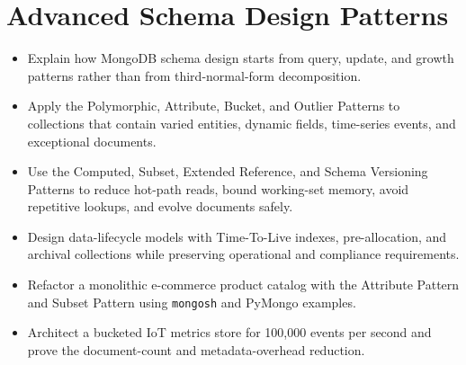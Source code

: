\chapter{Advanced Schema Design Patterns}
%

\begin{objectives}
\begin{itemize}
    \item Explain how MongoDB schema design starts from query, update, and growth patterns rather than from third-normal-form decomposition.
    \item Apply the Polymorphic, Attribute, Bucket, and Outlier Patterns to collections that contain varied entities, dynamic fields, time-series events, and exceptional documents.
    \item Use the Computed, Subset, Extended Reference, and Schema Versioning Patterns to reduce hot-path reads, bound working-set memory, avoid repetitive lookups, and evolve documents safely.
    \item Design data-lifecycle models with Time-To-Live indexes, pre-allocation, and archival collections while preserving operational and compliance requirements.
    \item Refactor a monolithic e-commerce product catalog with the Attribute Pattern and Subset Pattern using \texttt{mongosh} and PyMongo examples.
    \item Architect a bucketed IoT metrics store for 100,000 events per second and prove the document-count and metadata-overhead reduction.
\end{itemize}
\end{objectives}

